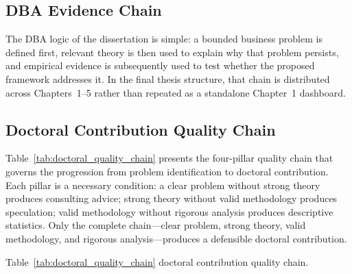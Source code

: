 \subsection{DBA Evidence Chain}

\noindent The DBA logic of the dissertation is simple: a bounded business problem is defined first, relevant theory is then used to explain why that problem persists, and empirical evidence is subsequently used to test whether the proposed framework addresses it. In the final thesis structure, that chain is distributed across Chapters~1--5 rather than repeated as a standalone Chapter~1 dashboard.

\label{tab:evidence_chain_dba}

\iffalse
\subsection{Doctoral Contribution Quality Chain}

Table~\ref{tab:doctoral_quality_chain} presents the four-pillar quality chain that governs the progression from problem identification to doctoral contribution. Each pillar is a necessary condition: a clear problem without strong theory produces consulting advice; strong theory without valid methodology produces speculation; valid methodology without rigorous analysis produces descriptive statistics. Only the complete chain---clear problem, strong theory, valid methodology, and rigorous analysis---produces a defensible doctoral contribution.


\noindent Table~\ref{tab:doctoral_quality_chain} doctoral contribution quality chain.

